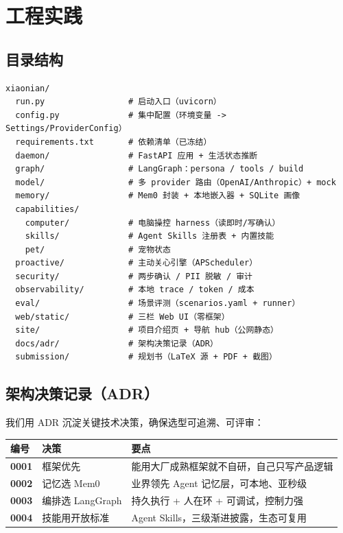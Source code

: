 
\chapter{工程实践}

\section{目录结构}
\begin{lstlisting}[caption={项目目录结构（节选）},captionpos=b]
xiaonian/
  run.py                 # 启动入口（uvicorn）
  config.py              # 集中配置（环境变量 -> Settings/ProviderConfig）
  requirements.txt       # 依赖清单（已冻结）
  daemon/                # FastAPI 应用 + 生活状态推断
  graph/                 # LangGraph：persona / tools / build
  model/                 # 多 provider 路由（OpenAI/Anthropic）+ mock
  memory/                # Mem0 封装 + 本地嵌入器 + SQLite 画像
  capabilities/
    computer/            # 电脑操控 harness（读即时/写确认）
    skills/              # Agent Skills 注册表 + 内置技能
    pet/                 # 宠物状态
  proactive/             # 主动关心引擎（APScheduler）
  security/              # 两步确认 / PII 脱敏 / 审计
  observability/         # 本地 trace / token / 成本
  eval/                  # 场景评测（scenarios.yaml + runner）
  web/static/            # 三栏 Web UI（零框架）
  site/                  # 项目介绍页 + 导航 hub（公网静态）
  docs/adr/              # 架构决策记录（ADR）
  submission/            # 规划书（LaTeX 源 + PDF + 截图）
\end{lstlisting}

\section{架构决策记录（ADR）}
我们用 ADR 沉淀关键技术决策，确保选型可追溯、可评审：

\begin{center}
\small
\begin{tabularx}{\linewidth}{>{\bfseries}p{1.2cm} p{4.4cm} X}
\toprule
编号 & 决策 & 要点 \\
\midrule
0001 & 框架优先 & 能用大厂成熟框架就不自研，自己只写产品逻辑 \\
0002 & 记忆选 Mem0 & 业界领先 Agent 记忆层，可本地、亚秒级 \\
0003 & 编排选 LangGraph & 持久执行 + 人在环 + 可调试，控制力强 \\
0004 & 技能用开放标准 & Agent Skills，三级渐进披露，生态可复用 \\
\bottomrule
\end{tabularx}
\end{center}

